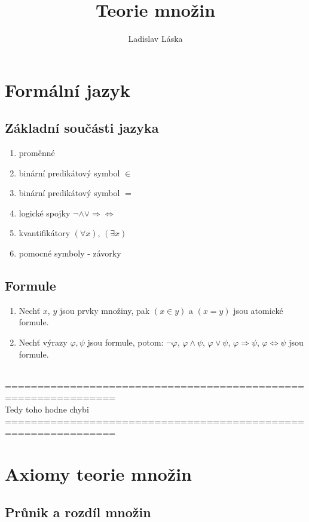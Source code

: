 \documentclass[a4paper,12pt,titlepage]{article}
\title{Teorie množin}
\author{Ladislav Láska}
\begin{document}
\maketitle
\newpage
\tableofcontents
\newpage

\section{Formální jazyk}
\setcounter{equation}{0}
\subsection{Základní součásti jazyka}
\setcounter{equation}{0}
\begin{enumerate}
	\item proměnné
	\item binární predikátový symbol $\in$
	\item binární predikátový symbol $=$
	\item logické spojky $\neg \land \lor \Rightarrow \Leftrightarrow$
	\item kvantifikátory $(\forall x)$, $(\exists x)$
	\item pomocné symboly - závorky
\end{enumerate}
\subsection{Formule}
\setcounter{equation}{0}
\begin{enumerate}
	\item Nechť $x$, $y$ jsou prvky množiny, pak $(x \in y)$ a $(x = y)$ jsou
	atomické formule.
	\item Nechť výrazy $\varphi, \psi$ jsou formule, potom:
			$\neg \varphi$, $\varphi \land \psi$, $\varphi \lor \psi$,
			$\varphi \Rightarrow \psi$, $\varphi \Leftrightarrow \psi$
			jsou formule.
\end{enumerate}

\ \\
===============================================================\\
Tedy toho hodne chybi\\
===============================================================
\section{Axiomy teorie množin}

\subsection{Průnik a rozdíl množin}
\setcounter{equation}{0}
\end{document}

